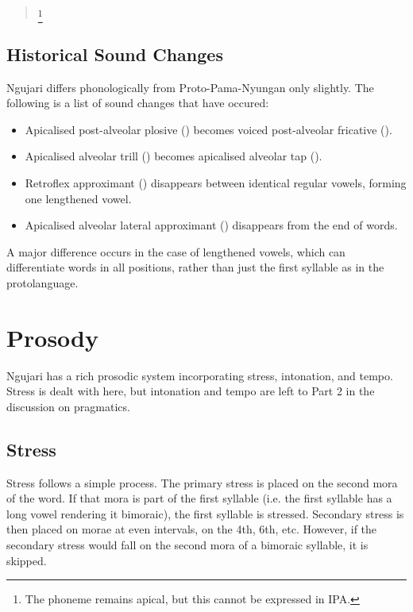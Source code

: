 \begin{quote}
\begin{multicols}{3}


\phonl{\textipa{\|]{t}}}{\textipa{\t*p}}{\^{}}\footnote{The phoneme remains
  apical, but this cannot be expressed in IPA.}
\end{multicols}
\end{quote}

\subsection{Historical Sound Changes}

Ngujari differs phonologically from Proto-Pama-Nyungan only slightly. The
following is a list of sound changes that have occured:

\begin{itemize}
\item Apicalised post-alveolar plosive () becomes
  voiced post-alveolar fricative ().
\item Apicalised alveolar trill (\textipa{\|]r}) becomes apicalised alveolar tap
  (\textipa{\|]R}).
\item Retroflex approximant (\textipa{\textturnrrtail}) disappears between
  identical regular vowels, forming one lengthened vowel.
\item Apicalised alveolar lateral approximant (\textipa{\|]l}) disappears from
  the end of words.
\end{itemize}

A major difference occurs in the case of lengthened vowels, which can
differentiate words in all positions, rather than just the first syllable as in
the protolanguage.

\section{Prosody}\label{prosody}

Ngujari has a rich prosodic system incorporating stress, intonation, and tempo.
Stress is dealt with here, but intonation and tempo are left to Part 2 in the
discussion on pragmatics.

\subsection{Stress}
Stress follows a simple process. The primary stress is placed on the second mora
of the word. If that mora is part of the first syllable (i.e. the first syllable
has a long vowel rendering it bimoraic), the first syllable is stressed.
Secondary stress is then placed on morae at even intervals, on the 4th, 6th,
etc. However, if the secondary stress would fall on the second mora of a
bimoraic syllable, it is skipped.
